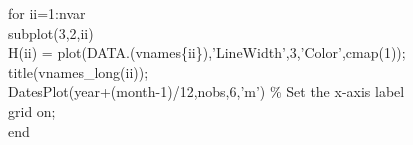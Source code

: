 \hspace{1mm}\hspace{5mm} \hspace{5mm} \hspace{5mm} \hspace{5mm} \textcolor{matlabblue}{for} ii=1:nvar \\ 
\hspace{1mm}\hspace{5mm} \hspace{5mm} \hspace{5mm} \hspace{5mm} \hspace{5mm} subplot(3,2,ii) \\ 
\hspace{1mm}\hspace{5mm} \hspace{5mm} \hspace{5mm} \hspace{5mm} \hspace{5mm} H(ii) = plot(DATA.(vnames\{ii\}),\textcolor{matlabpurple}{'LineWidth'},3,\textcolor{matlabpurple}{'Color'},cmap(1)); \\ 
\hspace{1mm}\hspace{5mm} \hspace{5mm} \hspace{5mm} \hspace{5mm} \hspace{5mm} title(vnames\_long(ii));  \\ 
\hspace{1mm}\hspace{5mm} \hspace{5mm} \hspace{5mm} \hspace{5mm} \hspace{5mm} DatesPlot(year+(month-1)/12,nobs,6,\textcolor{matlabpurple}{'m'}) \textcolor{matlabgreen}{\% Set the x-axis label  }\\ 
\hspace{1mm}\hspace{5mm} \hspace{5mm} \hspace{5mm} \hspace{5mm} \hspace{5mm} grid on;  \\ 
\hspace{1mm}\hspace{5mm} \hspace{5mm} \hspace{5mm} \hspace{5mm} \textcolor{matlabblue}{end} \\ 
